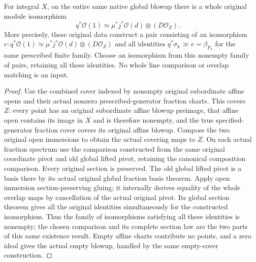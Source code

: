 \begin{definition}
\label{def:whole-original-native-global-line-comparison}
\leanok
{}
For integral $X$, on the entire same native global blowup there is a whole original module isomorphism
\[
 q^*\mathcal O(1)\simeq\mu^*j^*\mathcal O(d)\otimes(D\mathcal O_Z).
\]
More precisely, these original data construct a pair consisting of an isomorphism
$e:q^*\mathcal O(1)\simeq\mu^*j^*\mathcal O(d)\otimes(D\mathcal O_Z)$
and all identities $q^*\sigma_k\mathbin{\gg}e=\beta_{F_k}$ for the same
prescribed finite family. Choose an isomorphism from this nonempty family
of pairs, retaining all these identities. No whole line comparison or
overlap matching is an input.
\end{definition}
\begin{proof}
Use the combined cover indexed by nonempty original subordinate affine opens and their actual nonzero prescribed-generator fraction charts. This covers $Z$: every point has an original subordinate affine blowup preimage, that affine open contains its image in $X$ and is therefore nonempty, and the true specified-generator fraction cover covers its original affine blowup. Compose the two original open immersions to obtain the actual covering maps to $Z$. On each actual fraction spectrum use the comparison constructed from the same original coordinate pivot and old global lifted pivot, retaining the canonical composition comparison. Every original section is preserved. The old global lifted pivot is a basis there by its actual original global fraction basis theorem. Apply open immersion section-preserving gluing; it internally derives equality of the whole overlap maps by cancellation of the actual original pivot. Its global section theorem gives all the original identities simultaneously for the constructed isomorphism. Thus the family of isomorphisms satisfying all these identities is nonempty; the chosen comparison and its complete section law are the two parts of this same existence result. Empty affine charts contribute no points, and a zero ideal gives the actual empty blowup, handled by the same empty-cover construction.
\end{proof}

